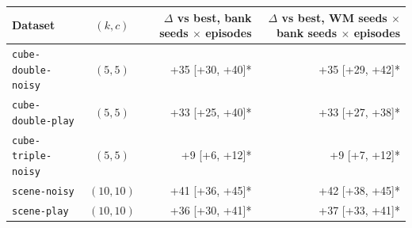 \begin{tabular}{lcrr}
\toprule
Dataset & $(k,c)$ & $\Delta$ vs best, bank seeds $\times$ episodes & $\Delta$ vs best, WM seeds $\times$ bank seeds $\times$ episodes \\
\midrule
\texttt{cube-double-noisy} & $(5,5)$ & +35 [+30, +40]* & +35 [+29, +42]* \\
\texttt{cube-double-play} & $(5,5)$ & +33 [+25, +40]* & +33 [+27, +38]* \\
\texttt{cube-triple-noisy} & $(5,5)$ & +9 [+6, +12]* & +9 [+7, +12]* \\
\texttt{scene-noisy} & $(10,10)$ & +41 [+36, +45]* & +42 [+38, +45]* \\
\texttt{scene-play} & $(10,10)$ & +36 [+30, +41]* & +37 [+33, +41]* \\
\bottomrule
\end{tabular}
